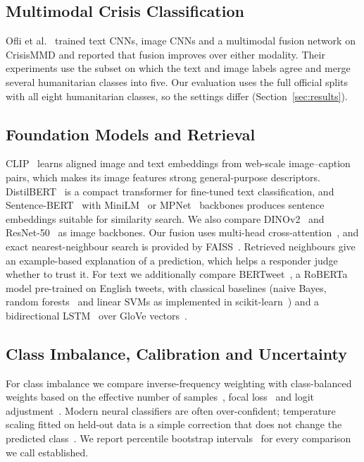 \documentclass[conference]{IEEEtran}
\begin{document}
\subsection{Multimodal Crisis Classification}
Ofli et al.~\cite{ofli2020} trained text CNNs, image CNNs and a multimodal fusion network on CrisisMMD and reported that fusion improves over either modality. Their experiments use the subset on which the text and image labels agree and merge several humanitarian classes into five. Our evaluation uses the full official splits with all eight humanitarian classes, so the settings differ (Section~\ref{sec:results}).

\subsection{Foundation Models and Retrieval}
CLIP~\cite{radford2021} learns aligned image and text embeddings from web-scale image--caption pairs, which makes its image features strong general-purpose descriptors. DistilBERT~\cite{sanh2019} is a compact transformer for fine-tuned text classification, and Sentence-BERT~\cite{reimers2019} with MiniLM~\cite{wang2020} or MPNet~\cite{song2020} backbones produces sentence embeddings suitable for similarity search. We also compare DINOv2~\cite{oquab2024} and ResNet-50~\cite{he2016} as image backbones. Our fusion uses multi-head cross-attention~\cite{vaswani2017}, and exact nearest-neighbour search is provided by FAISS~\cite{johnson2021}. Retrieved neighbours give an example-based explanation of a prediction, which helps a responder judge whether to trust it. For text we additionally compare BERTweet~\cite{nguyen2020}, a RoBERTa~\cite{liu2019} model pre-trained on English tweets, with classical baselines (naive Bayes, random forests~\cite{breiman2001} and linear SVMs as implemented in scikit-learn~\cite{pedregosa2011}) and a bidirectional LSTM~\cite{hochreiter1997,schuster1997} over GloVe vectors~\cite{pennington2014}.

\subsection{Class Imbalance, Calibration and Uncertainty}
For class imbalance we compare inverse-frequency weighting with class-balanced weights based on the effective number of samples~\cite{cui2019}, focal loss~\cite{lin2017} and logit adjustment~\cite{menon2021}. Modern neural classifiers are often over-confident; temperature scaling fitted on held-out data is a simple correction that does not change the predicted class~\cite{guo2017}. We report percentile bootstrap intervals~\cite{efron1993} for every comparison we call established.
\end{document}
